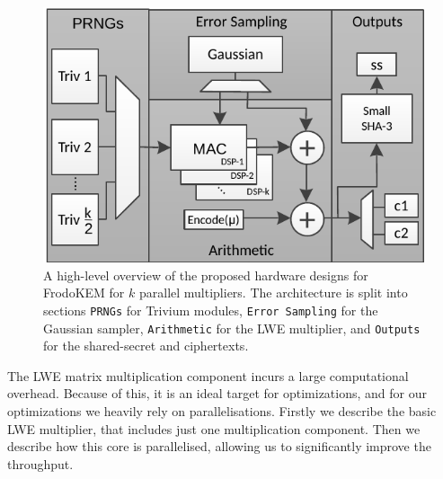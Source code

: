 \begin{figure}[htbp]\centering
\includegraphics[scale=1]{figures/arch_new.pdf}
\caption{A high-level overview of the proposed hardware designs for FrodoKEM for $k$ parallel multipliers. The architecture is split into sections \texttt{PRNGs} for Trivium modules, \texttt{Error Sampling} for the Gaussian sampler, \texttt{Arithmetic} for the LWE multiplier, and \texttt{Outputs} for the shared-secret and ciphertexts.}\label{arch}
\end{figure}

The LWE matrix multiplication component incurs a large computational overhead. Because of this, it is an ideal target for optimizations, and for our optimizations we heavily rely on parallelisations. Firstly we describe the basic LWE multiplier, that includes just one multiplication component. Then we describe how this core is parallelised, allowing us to significantly improve the throughput.

